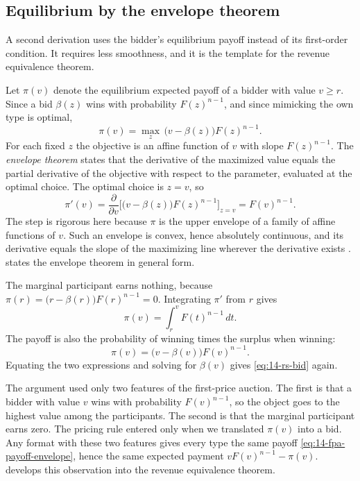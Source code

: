 \subsection{Equilibrium by the envelope theorem}\label{sec:14-fpa-envelope}

A second derivation uses the bidder's equilibrium payoff instead of its first-order condition. It requires less smoothness, and it is the template for the revenue equivalence theorem.

Let $\pi(v)$ denote the equilibrium expected payoff of a bidder with value $v\ge r$. Since a bid $\beta(z)$ wins with probability $F(z)^{n-1}$, and since mimicking the own type is optimal,
\[
\pi(v)=\max_{z}\,\big(v-\beta(z)\big)F(z)^{n-1}.
\]
For each fixed $z$ the objective is an affine function of $v$ with slope $F(z)^{n-1}$. The \emph{envelope theorem} states that the derivative of the maximized value equals the partial derivative of the objective with respect to the parameter, evaluated at the optimal choice. The optimal choice is $z=v$, so
\[
\pi'(v)=\frac{\partial}{\partial v}\Big[\big(v-\beta(z)\big)F(z)^{n-1}\Big]_{z=v}=F(v)^{n-1}.
\]
The step is rigorous here because $\pi$ is the upper envelope of a family of affine functions of $v$. Such an envelope is convex, hence absolutely continuous, and its derivative equals the slope of the maximizing line wherever the derivative exists \citep{MilgromSegal2002}.  states the envelope theorem in general form.

The marginal participant earns nothing, because $\pi(r)=\big(r-\beta(r)\big)F(r)^{n-1}=0$. Integrating $\pi'$ from $r$ gives
\begin{equation}\label{eq:14-fpa-payoff-envelope}
\pi(v)=\int_r^v F(t)^{n-1}\,dt.
\end{equation}
The payoff is also the probability of winning times the surplus when winning:
\[
\pi(v)=\big(v-\beta(v)\big)F(v)^{n-1}.
\]
Equating the two expressions and solving for $\beta(v)$ gives \eqref{eq:14-rs-bid} again.

The argument used only two features of the first-price auction. The first is that a bidder with value $v$ wins with probability $F(v)^{n-1}$, so the object goes to the highest value among the participants. The second is that the marginal participant earns zero. The pricing rule entered only when we translated $\pi(v)$ into a bid. Any format with these two features gives every type the same payoff \eqref{eq:14-fpa-payoff-envelope}, hence the same expected payment $vF(v)^{n-1}-\pi(v)$.  develops this observation into the revenue equivalence theorem.

